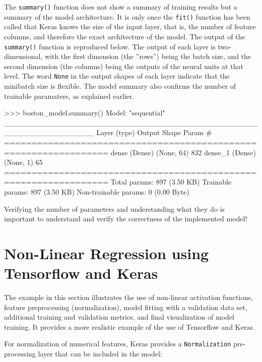 The \texttt{summary()} function does not show a summary of training results but a summary of the model architecture. It is only once the \texttt{fit()} function has been called that Keras knows the size of the input layer, that is, the number of feature columns, and therefore the exact architecture of the model. The output of the \texttt{summary()} function is reproduced below. The output of each layer is two-dimensional, with the first dimension (the ''rows'') being the batch size, and the second dimension (the columns) being the outputs of the neural units at that level. The word \texttt{None} in the output shapes of each layer indicate that the minibatch size is flexible. The model summary also confirms the number of trainable paramaters, as explained earlier.

\begin{samepage}
\begin{textcode}
>>> boston_model.summary()
Model: "sequential"
_________________________________________________________________
 Layer (type)                Output Shape              Param #   
=================================================================
 dense (Dense)               (None, 64)                832       
 dense_1 (Dense)             (None, 1)                 65        
=================================================================
Total params: 897 (3.50 KB)
Trainable params: 897 (3.50 KB)
Non-trainable params: 0 (0.00 Byte)
\end{textcode}
\end{samepage}

\begin{tcolorbox}[colback=alert]
Verifying the number of parameters and understanding what they do is important to understand and verify the correctness of the implemented model!
\end{tcolorbox}

\section{Non-Linear Regression using Tensorflow and Keras}

The example in this section illustrates the use of non-linear activation functions, feature preprocessing (normalization), model fitting with a validation data set, additional training and validation metrics, and final visualization of model training. It provides a more realistic example of the use of Tensorflow and Keras. 

For normalization of numerical features, Keras provides a \texttt{Normalization} pre-processing layer that can be included in the model:

